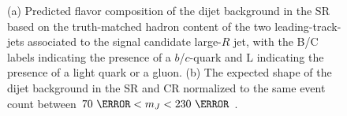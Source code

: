 \begin{figure}[!htbp]
\centering
{}\hfill
{}

\caption{(a) Predicted flavor composition of the dijet background in the SR based on the truth-matched hadron content of the two leading-\pt track-jets associated to the signal candidate large-$R$ jet, with the B/C labels indicating the presence of a $b$/$c$-quark and L indicating the presence of a light quark or a gluon. (b) The expected shape of the dijet background in the SR and CR normalized to the same event count between $70~\GeV < m_{J} < 230~\GeV$ \cite{ATLAS-CONF-2018-052}.}
\label{fig:flavor_shape}
\end{figure}

